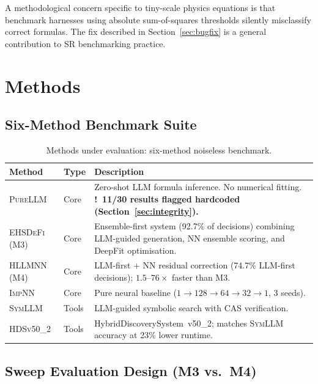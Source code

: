 \documentclass[twoside,11pt]{article}
\newcommand{\PureLLM}{\textsc{PureLLM}}
\newcommand{\INN}{\textsc{ImpNN}}
\newcommand{\EHD}{\textsc{EHSDeFi}}
\newcommand{\HSL}{\textsc{HLLMNN}}
\newcommand{\SEL}{\textsc{SymLLM}}
\newcommand{\HDS}{\textsc{HDSv50\_2}}
\newcommand{\warn}{{\color{warnAmber}\textbf{!}}}
\begin{document}
A methodological concern specific to tiny-scale physics equations is that
benchmark harnesses using absolute sum-of-squares thresholds silently
misclassify correct formulas.  The fix described in Section~\ref{sec:bugfix}
is a general contribution to SR benchmarking practice.

\section{Methods}
\label{sec:methods}

\subsection{Six-Method Benchmark Suite}
\label{sec:methods:sixmethod}

\begin{table}[ht]
\caption{Methods under evaluation: six-method noiseless benchmark.}
\label{tab:methods}
\centering
\small
\renewcommand{\arraystretch}{1.3}
\begin{tabular}{L{2.1cm} L{1.3cm} L{8.0cm}}
\toprule
\textbf{Method} & \textbf{Type} & \textbf{Description} \\
\midrule
{}
\PureLLM & Core &
  Zero-shot LLM formula inference.  No numerical fitting.
  \textbf{\warn~11/30 results flagged hardcoded (Section~\ref{sec:integrity}).} \\
\EHD\,(M3) & Core &
  Ensemble-first system (92.7\% of decisions) combining LLM-guided generation,
  NN ensemble scoring, and DeepFit optimisation. \\
\HSL\,(M4) & Core &
  LLM-first + NN residual correction (74.7\% LLM-first decisions);
  $1.5$--$76\times$ faster than M3. \\
\INN & Core &
  Pure neural baseline ($1\!\to\!128\!\to\!64\!\to\!32\!\to\!1$, 3 seeds). \\
\SEL & Tools &
  LLM-guided symbolic search with CAS verification. \\
\HDS & Tools &
  HybridDiscoverySystem~v50\_2; matches \SEL{} accuracy at 23\% lower runtime. \\
\bottomrule
\end{tabular}
\end{table}

\subsection{Sweep Evaluation Design (M3 vs.\ M4)}
\label{sec:methods:sweep}
\end{document}
